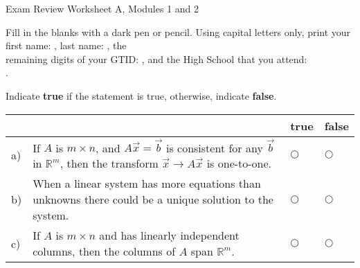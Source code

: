 \documentclass[12pt]{exam}
\newcommand{\Semester}{Fall}
\newcommand{\TestName}{Exam Review Worksheet A, Modules 1 and 2}
\begin{document}
    
\begin{center}
{\Large \TestName} %
\end{center}

\begin{questions}
\question[1] Fill in the blanks with a dark pen or pencil. 
Using capital letters only, print your first name: \framebox{\strut\hspace{5cm}}, last name: \framebox{\strut\hspace{5cm}}, the \\[2pt] remaining digits of your GTID:  \framebox{\strut\hspace{0.2cm}}\framebox{\strut\hspace{0.2cm}}\framebox{\strut\hspace{0.2cm}}\framebox{\strut\hspace{0.2cm}}\framebox{\strut\hspace{0.2cm}}\framebox{\strut\hspace{0.2cm}}\framebox{\strut\hspace{0.2cm}}, and the High School that you attend: \\[2pt]\framebox{\strut\hspace{6cm}}.

\question[5] Indicate \textbf{true} if the statement is true, otherwise, indicate \textbf{false}.

    \vspace{-0.8cm}
    \setlength{\extrarowheight}{0.25cm}
    \begin{center}
    \hspace{-.9cm}\begin{tabular}{ p{.15cm} p{14.5cm} p{.5cm} p{.6cm} }
        
         & & true &  false  \\[2pt] \hline 

        a) & If $A$ is $m \times n$, and $ A \vec x = \vec b$ is consistent for any $\vec b$ in $\mathbb R^m$, then the transform $\vec x \to A\vec x$ is one-to-one.  & $\bigcirc$  & $\bigcirc$ \\ 
        
        b) & When a linear system has more equations than unknowns there could be a unique solution to the system. & $\bigcirc$  & $\bigcirc$ \\ 

        c) & If $A$ is $m\times n$ and has linearly independent columns, then the columns of $A$ span $\mathbb R^m$.  & $\bigcirc$  & $\bigcirc$ \\ 


\end{tabular}
\end{center}
\end{questions}
\end{document}
